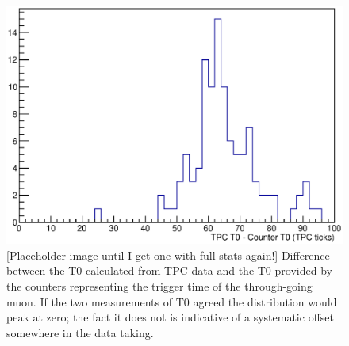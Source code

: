 \begin{figure}
  \centering
  \includegraphics[width=14cm]{TPCCounterT0Difference.eps}
  \caption[Difference between the T0 calculated from TPC data and the T0 provided by the counters representing the trigger time of the through-going muon.]{[Placeholder image until I get one with full stats again!] Difference between the T0 calculated from TPC data and the T0 provided by the counters representing the trigger time of the through-going muon.  If the two measurements of T0 agreed the distribution would peak at zero; the fact it does not is indicative of a systematic offset somewhere in the data taking.}
  \label{fig:TPCCounterT0Difference}
\end{figure}

